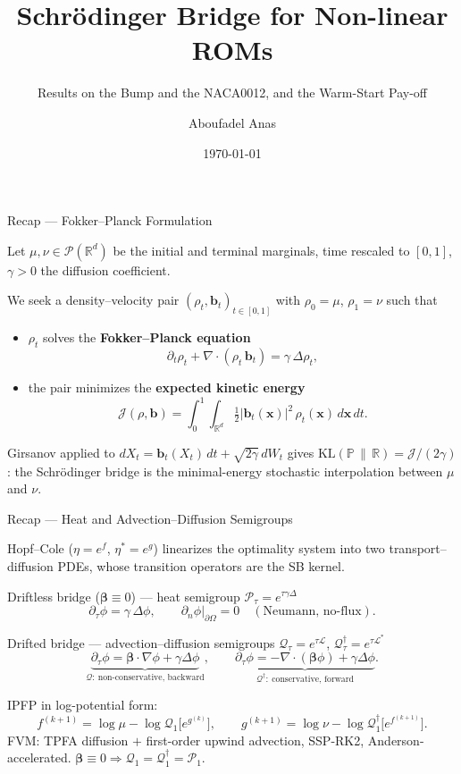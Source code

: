 \documentclass[aspectratio=169]{beamer}
\title[SB ROMs — Bump \& NACA0012]{Schrödinger Bridge for Non-linear ROMs}
\subtitle{Results on the Bump and the NACA0012, and the Warm-Start Pay-off}
\author{Aboufadel Anas}
\date{\today}
\newcommand{\bt}{\mathbf{b}}
\newcommand{\xv}{\mathbf{x}}
\newcommand{\grad}{\nabla}
\newcommand{\dive}{\nabla\!\cdot}
\newcommand{\Qcal}{\mathcal{Q}}
\newcommand{\Pcal}{\mathcal{P}}
\begin{document}
\begin{frame}
    \titlepage
\end{frame}
\begin{frame}{Recap — Fokker--Planck Formulation}

Let $\mu,\nu\in\mathcal{P}(\mathbb{R}^d)$ be the initial and terminal marginals,
time rescaled to $[0,1]$, $\gamma>0$ the diffusion coefficient.

We seek a density--velocity pair $(\rho_t,\bt_t)_{t\in[0,1]}$ with
$\rho_0=\mu$, $\rho_1=\nu$ such that
\begin{itemize}
    \item $\rho_t$ solves the \textbf{Fokker--Planck equation}
    \[
        \partial_t \rho_t + \dive(\rho_t\,\bt_t) = \gamma\,\Delta \rho_t ,
    \]
    \item the pair minimizes the \textbf{expected kinetic energy}
    \[
        \mathcal{J}(\rho,\bt)=\int_0^1\!\!\int_{\mathbb{R}^d}\tfrac12|\bt_t(\xv)|^2\,\rho_t(\xv)\,d\xv\,dt .
    \]
\end{itemize}

Girsanov applied to $dX_t=\bt_t(X_t)\,dt+\sqrt{2\gamma}\,dW_t$ gives
$\mathrm{KL}(\mathbb{P}\,\|\,\mathbb{R})=\mathcal{J}/(2\gamma)$: the Schrödinger
bridge is the minimal-energy stochastic interpolation between $\mu$ and $\nu$.

\end{frame}
\begin{frame}{Recap — Heat and Advection--Diffusion Semigroups}

Hopf--Cole ($\eta=e^{f}$, $\eta^\ast=e^{g}$) linearizes the optimality system into
two transport--diffusion PDEs, whose transition operators are the SB kernel.

\begin{block}{Driftless bridge ($\boldsymbol{\beta}\equiv0$) — heat semigroup $\Pcal_\tau=e^{\tau\gamma\Delta}$}
\[
    \partial_\tau\phi=\gamma\,\Delta\phi,\qquad \partial_n\phi|_{\partial\Omega}=0
    \quad(\text{Neumann, no-flux}).
\]
\end{block}

\begin{block}{Drifted bridge — advection--diffusion semigroups $\Qcal_\tau=e^{\tau\mathcal{L}}$, $\Qcal^{\dagger}_\tau=e^{\tau\mathcal{L}^\ast}$}
\[
    \underbrace{\partial_\tau\phi=\boldsymbol{\beta}\cdot\grad\phi+\gamma\Delta\phi}_{\Qcal:\ \text{non-conservative, backward}},
    \qquad
    \underbrace{\partial_\tau\phi=-\dive(\boldsymbol{\beta}\phi)+\gamma\Delta\phi}_{\Qcal^{\dagger}:\ \text{conservative, forward}} .
\]
\end{block}

IPFP in log-potential form:
\[
    f^{(k+1)}=\log\mu-\log\Qcal_1\!\bigl[e^{g^{(k)}}\bigr],
    \qquad
    g^{(k+1)}=\log\nu-\log\Qcal^{\dagger}_1\!\bigl[e^{f^{(k+1)}}\bigr].
\]
FVM: TPFA diffusion $+$ first-order upwind advection, SSP-RK2, Anderson-accelerated.
$\boldsymbol{\beta}\equiv0\Rightarrow\Qcal_1=\Qcal^{\dagger}_1=\Pcal_1$.

\end{frame}
\end{document}
